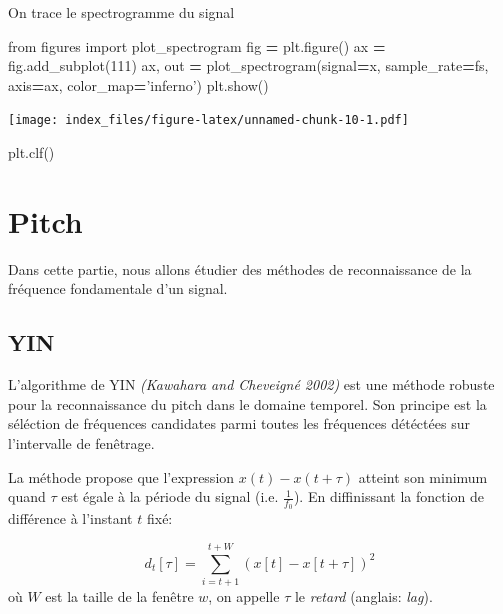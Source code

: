 \documentclass[]{article}
\newenvironment{Shaded}{\begin{snugshade}}{\end{snugshade}}
\newcommand{\DecValTok}[1]{\textcolor[rgb]{0.00,0.00,0.81}{#1}}
\newcommand{\ImportTok}[1]{#1}
\newcommand{\NormalTok}[1]{#1}
\newcommand{\OperatorTok}[1]{\textcolor[rgb]{0.81,0.36,0.00}{\textbf{#1}}}
\newcommand{\StringTok}[1]{\textcolor[rgb]{0.31,0.60,0.02}{#1}}
\begin{document}
\pagebreak

On trace le spectrogramme du signal

\begin{Shaded}
\begin{Highlighting}[]
\ImportTok{from}\NormalTok{ figures }\ImportTok{import}\NormalTok{ plot_spectrogram}
\NormalTok{fig }\OperatorTok{=}\NormalTok{ plt.figure()}
\NormalTok{ax }\OperatorTok{=}\NormalTok{ fig.add_subplot(}\DecValTok{111}\NormalTok{)}
\NormalTok{ax, out }\OperatorTok{=}\NormalTok{ plot_spectrogram(signal}\OperatorTok{=}\NormalTok{x, sample_rate}\OperatorTok{=}\NormalTok{fs, axis}\OperatorTok{=}\NormalTok{ax, color_map}\OperatorTok{=}\StringTok{'inferno'}\NormalTok{)}
\NormalTok{plt.show()}
\end{Highlighting}
\end{Shaded}

\texttt{[image: index\_files/figure-latex/unnamed-chunk-10-1.pdf]}

\begin{Shaded}
\begin{Highlighting}[]
\NormalTok{plt.clf()}
\end{Highlighting}
\end{Shaded}

\hypertarget{pitch}{%
\section{Pitch}\label{pitch}}

Dans cette partie, nous allons étudier des méthodes de reconnaissance de
la fréquence fondamentale d'un signal.

\hypertarget{yin}{%
\subsection{YIN}\label{yin}}

L'algorithme de YIN \emph{(Kawahara and Cheveigné 2002)} est une méthode
robuste pour la reconnaissance du pitch dans le domaine temporel. Son
principe est la séléction de fréquences candidates parmi toutes les
fréquences détéctées sur l'intervalle de fenêtrage.

La méthode propose que l'expression \(x(t)-x(t+\tau)\) atteint son
minimum quand \(\tau\) est égale à la période du signal (i.e.
\(\frac{1}{f_0}\)). En diffinissant la fonction de différence à
l'instant \(t\) fixé:

\[ d_t[\tau] = \sum\limits_{i=t+1}^{t+W} \left(x[t]-x[t+\tau]\right)^2 \]
où \(W\) est la taille de la fenêtre \(w\), on appelle \(\tau\) le
\emph{retard} (anglais: \emph{lag}).
\end{document}
